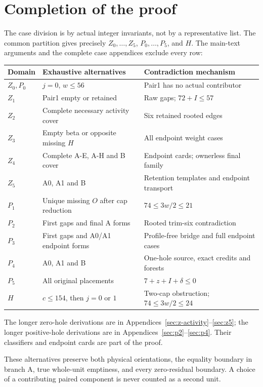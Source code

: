 \documentclass[11pt,letterpaper]{article}
\theoremstyle{definition}\newtheorem{definition}[theorem]{Definition}
\begin{document}
\section{Completion of the proof}\label{sec:conclusion}
The case division is by actual integer invariants, not by a representative list. The common partition gives precisely $Z_0,\ldots,Z_5$, $P_0,\ldots,P_5$, and $H$. The main-text arguments and the complete case appendices exclude every row:
\begin{center}\small
\begin{tabular}{@{}lll@{}}\toprule
Domain&Exhaustive alternatives&Contradiction mechanism\\\midrule
$Z_0,P_0$&$j=0$, $w\le56$&Pair1 has no actual contributor\\
$Z_1$&Pair1 empty or retained&Raw gaps; $72+I\le57$\\
$Z_2$&Complete necessary activity cover&Six retained rooted edges\\
$Z_3$&Empty beta or opposite missing $H$&All endpoint weight cases\\
$Z_4$&Complete A-E, A-H and B cover&Endpoint cards; ownerless final family\\
$Z_5$&A0, A1 and B&Retention templates and endpoint transport\\
$P_1$&Unique missing $O$ after cap reduction&$74\le3w/2\le21$\\
$P_2$&First gaps and final A forms&Rooted trim-six contradiction\\
$P_3$&First gaps and A0/A1 endpoint forms&Profile-free bridge and full endpoint cases\\
$P_4$&A0, A1 and B&One-hole source, exact credits and forests\\
$P_5$&All original placements&$7+z+I+\delta\le0$\\
$H$&$c\le154$, then $j=0$ or $1$&Two-cap obstruction; $74\le3w/2\le24$\\\bottomrule
\end{tabular}
\end{center}
The longer zero-hole derivations are in Appendices~\ref{sec:z-activity}--\ref{sec:z5}; the longer positive-hole derivations are in Appendices~\ref{sec:p2}--\ref{sec:p4}. Their classifiers and endpoint cards are part of the proof.

These alternatives preserve both physical orientations, the equality boundary in branch A, true whole-unit emptiness, and every zero-residual boundary. A choice of a contributing paired component is never counted as a second unit.
\end{document}
